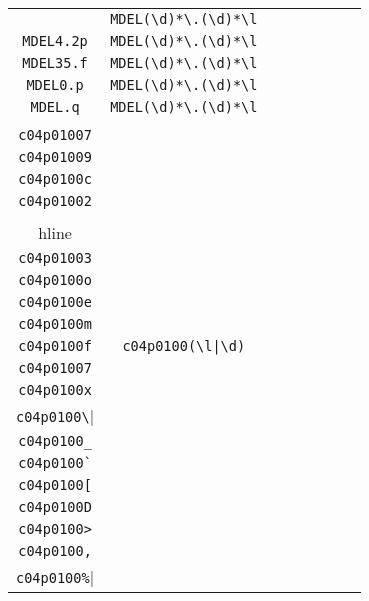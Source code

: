 \begin{longtable}{cccccccc}
\begin{tabular}{ll}
    \verb|MDEL.h| & \verb|MDEL(\d)*\.(\d)*\l|\\
\verb|MDEL4.2p| & \verb|MDEL(\d)*\.(\d)*\l|\\
\verb|MDEL35.f| & \verb|MDEL(\d)*\.(\d)*\l|\\
\verb|MDEL0.p| & \verb|MDEL(\d)*\.(\d)*\l|\\
\verb|MDEL.q| & \verb|MDEL(\d)*\.(\d)*\l|
\end{tabular}
\\\midrule 
\begin{tabular}{l}
    \verb|c04p0100a|\\
\verb|c04p01007|\\
\verb|c04p01009|\\
\verb|c04p0100c|\\
\verb|c04p01002|\\
\\hline\\
\verb|c04p01003|\\
\verb|c04p0100o|\\
\verb|c04p0100e|\\
\verb|c04p0100m|\\
\verb|c04p0100f|
\end{tabular}

&
\verb.c04p0100(\l|\d).
&

\begin{tabular}{l}
    \verb|c04p0100.|\\
\verb|c04p01007|\\
\verb|c04p0100x|\\
\verb|c04p0100\|\\
\verb|c04p0100_|\\
\verb|c04p0100`|
\end{tabular}

&

\begin{tabular}{l}
    \verb|c04p0100.|\\
\verb|c04p0100[|\\
\verb|c04p0100D|\\
\verb|c04p0100>|\\
\verb|c04p0100,|\\
\verb|c04p0100%|
\end{tabular}

&


\end{longtable}
